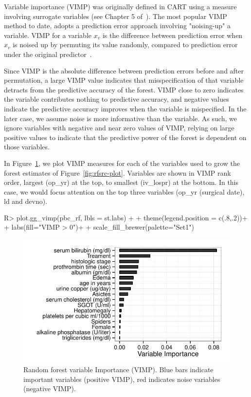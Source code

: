 \documentclass[nojss]{jss}\usepackage[]{graphicx}\usepackage[]{color}
\makeatletter
\def\maxwidth{ %
  \ifdim\Gin@nat@width>\linewidth
    \linewidth
  \else
    \Gin@nat@width
  \fi
}
\makeatother
\begin{document}
Variable importance (VIMP) was originally defined in CART using a measure involving surrogate variables (see Chapter 5 of~\cite{cart:1984}). The most popular VIMP method to date, adopts a prediction error approach involving "noising-up" a variable. VIMP for a variable $x_v$ is the difference between prediction error when $x_v$ is noised up by permuting its value randomly, compared to prediction error under the original predictor~\citep{Breiman:2001, liaw:2002, Ishwaran:2007, Ishwaran:2008}.

Since VIMP is the absolute difference between prediction errors before and after permutation, a large VIMP value indicates that misspecification of that variable detracts from the predictive accuracy of the forest. VIMP close to zero indicates the variable contributes nothing to predictive accuracy, and negative values indicate the predictive accuracy improves when the variable is mispecified. In the later case, we assume noise is more informative than the variable. As such, we ignore variables with negative and near zero values of VIMP, relying on large positive values to indicate that the predictive power of the forest is dependent on those variables. 

In Figure~\ref{fig:rf-vimp}, we plot VIMP measures for each of the variables used to grow the forest estimates of Figure~\ref{fig:rfsrc-plot}. Variables are shown in VIMP rank order, largest (op\_yr) at the top, to smallest (iv\_lospr) at the bottom. In this case, we would focus attention on the top three variables (op\_yr (surgical date), ld and devno).
\begin{Schunk}
\begin{Sinput}
R> plot.gg_vimp(pbc_rf, lbls = st.labs) + 
+   theme(legend.position = c(.8,.2))+
+   labs(fill="VIMP > 0")+
+   scale_fill_brewer(palette="Set1")
\end{Sinput}
\begin{figure}[!htpb]

{\centering \includegraphics[width=\maxwidth]{figure/rfs-rf-vimp-1} 

}

\caption[Random forest variable Importance (VIMP)]{Random forest variable Importance (VIMP). Blue bars indicate important variables (positive VIMP), red indicates noise variables (negative VIMP).\label{fig:rf-vimp}}
\end{figure}
\end{Schunk}
\end{document}
